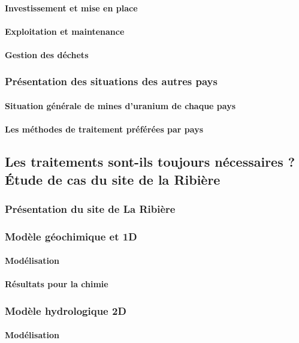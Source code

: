 \documentclass{article}
\begin{document}
\paragraph{Investissement et mise en place}
\paragraph{Exploitation et maintenance}
\paragraph{Gestion des déchets }
\subsubsection{Présentation des situations des autres pays}
\paragraph{Situation générale de mines d’uranium de chaque pays}
\paragraph{Les méthodes de traitement préférées par pays}

\subsection{Les traitements sont-ils toujours nécessaires ? Étude de cas du site de la Ribière}
\subsubsection{Présentation du site de La Ribière}
\subsubsection{Modèle géochimique et 1D}
\paragraph{Modélisation}
\paragraph{Résultats pour la chimie}
\subsubsection{Modèle hydrologique 2D}
\paragraph{Modélisation}
\end{document}
